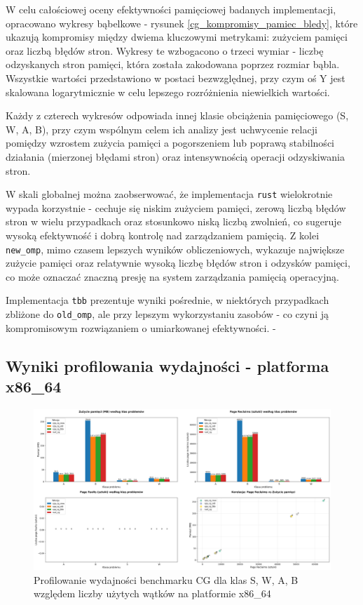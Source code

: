 W celu całościowej oceny efektywności pamięciowej badanych implementacji, opracowano wykresy bąbelkowe - rysunek \ref{cg_kompromisy_pamiec_bledy}, które ukazują kompromisy między dwiema kluczowymi metrykami: zużyciem pamięci oraz liczbą błędów stron. Wykresy te wzbogacono o trzeci wymiar - liczbę odzyskanych stron pamięci, która została zakodowana poprzez rozmiar bąbla. Wszystkie wartości przedstawiono w postaci bezwzględnej, przy czym oś Y jest skalowana logarytmicznie w celu lepszego rozróżnienia niewielkich wartości.

Każdy z czterech wykresów odpowiada innej klasie obciążenia pamięciowego (S, W, A, B), przy czym wspólnym celem ich analizy jest uchwycenie relacji pomiędzy wzrostem zużycia pamięci a pogorszeniem lub poprawą stabilności działania (mierzonej błędami stron) oraz intensywnością operacji odzyskiwania stron.

W skali globalnej można zaobserwować, że implementacja \texttt{rust} wielokrotnie wypada korzystnie - cechuje się niskim zużyciem pamięci, zerową liczbą błędów stron w wielu przypadkach oraz stosunkowo niską liczbą zwolnień, co sugeruje wysoką efektywność i dobrą kontrolę nad zarządzaniem pamięcią. Z kolei \texttt{new\_omp}, mimo czasem lepszych wyników obliczeniowych, wykazuje największe zużycie pamięci oraz relatywnie wysoką liczbę błędów stron i odzysków pamięci, co może oznaczać znaczną presję na system zarządzania pamięcią operacyjną.

Implementacja \texttt{tbb} prezentuje wyniki pośrednie, w niektórych przypadkach zbliżone do \texttt{old\_omp}, ale przy lepszym wykorzystaniu zasobów - co czyni ją kompromisowym rozwiązaniem o umiarkowanej efektywności.
-
\subsection{Wyniki profilowania wydajności - platforma x86\_64}
\begin{figure}[H]
    \centering
    \includegraphics[width=\textwidth]{analiza/images/parallel/cg/x86/chart_01_memory_comparison.png}
    \caption{Profilowanie wydajności benchmarku CG dla klas S, W, A, B względem liczby użytych wątków na platformie x86\_64}
    \label{cg_porownanie_zuzycia_pamieci_x86_64}
\end{figure}
